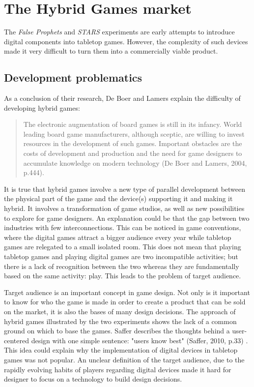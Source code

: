 \section{The Hybrid Games market}
The \textit{False Prophets} and \textit{STARS} experiments are early attempts to introduce digital components into tabletop games. However, the complexity of such devices made it very difficult to turn them into a commercially viable product. 

\subsection{Development problematics}
As a conclusion of their research, De Boer and Lamers explain the difficulty of developing hybrid games:

\begin{quotation}
The electronic augmentation of board games is still in its infancy. World leading board game manufacturers, although sceptic, are willing to invest resources in the development of such games. Important obstacles are the costs of development and production and the need for game designers to accumulate knowledge on modern technology (De Boer and Lamers, 2004, p.444)\cite{chap:aug}.
\end{quotation}

It is true that hybrid games involve a new type of parallel development between the physical part of the game and the device(s) supporting it and making it hybrid. It involves a transformation of game studios, as well as new possibilities to explore for game designers. An explanation could be that the gap between two industries with few interconnections. This can be noticed in game conventions, where the digital games attract a bigger audience every year while tabletop games are relegated to a small isolated room. This does not mean that playing tabletop games and playing digital games are two incompatible activities; but there is a lack of recognition between the two whereas they are fundamentally based on the same activity: play. This leads to the problem of target audience.

Target audience is an important concept in game design. Not only is it important to know for who the game is made in order to create a product that can be sold on the market, it is also the bases of many design decisions. The approach of hybrid games illustrated by the two experiments shows the lack of a common ground on which to base the games. Saffer describes the thoughts behind a user-centered design with one simple sentence: "users know best" (Saffer, 2010, p.33) \cite{book:id}. This idea could explain why the implementation of digital devices in tabletop games was not popular.  An unclear definition of the target audience, due to the rapidly evolving habits of players regarding digital devices made it hard for designer to focus on a technology to build design decisions.

